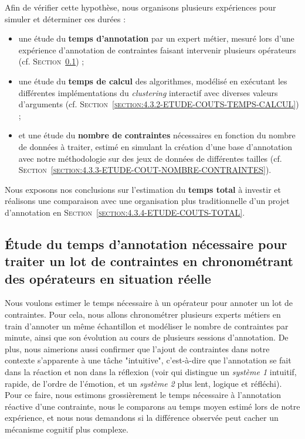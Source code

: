 	Afin de vérifier cette hypothèse, nous organisons plusieurs expériences pour simuler et déterminer ces durées :
	\begin{itemize}
		\item une étude du \textbf{temps d'annotation} par un expert métier, mesuré lors d'une expérience d'annotation de contraintes faisant intervenir plusieurs opérateurs (cf. \textsc{Section~\ref{section:4.3.1-ETUDE-COUTS-TEMPS-ANNOTATION}}) ;
		\item une étude du \textbf{temps de calcul} des algorithmes, modélisé en exécutant les différentes implémentations du \textit{clustering} interactif avec diverses valeurs d'arguments (cf. \textsc{Section~\ref{section:4.3.2-ETUDE-COUTS-TEMPS-CALCUL}}) ;
		\item et une étude du \textbf{nombre de contraintes} nécessaires en fonction du nombre de données à traiter, estimé en simulant la création d'une base d'annotation avec notre méthodologie sur des jeux de données de différentes tailles (cf. \textsc{Section~\ref{section:4.3.3-ETUDE-COUT-NOMBRE-CONTRAINTES}}).
	\end{itemize}
	Nous exposons nos conclusions sur l'estimation du \textbf{temps total} à investir et réalisons une comparaison avec une organisation plus traditionnelle d'un projet d'annotation en \textsc{Section~\ref{section:4.3.4-ETUDE-COUTS-TOTAL}}.
	
	
	\subsection{Étude du temps d'annotation nécessaire pour traiter un lot de contraintes en chronométrant des opérateurs en situation réelle}
	\label{section:4.3.1-ETUDE-COUTS-TEMPS-ANNOTATION}
		
		Nous voulons estimer le temps nécessaire à un opérateur pour annoter un lot de contraintes.
		Pour cela, nous allons chronométrer plusieurs experts métiers en train d'annoter un même échantillon et modéliser le nombre de contraintes par minute, ainsi que son évolution au cours de plusieurs sessions d'annotation.
		De plus, nous aimerions aussi confirmer que l'ajout de contraintes dans notre contexte s'apparente à une tâche "intuitive", c'est-à-dire que l'annotation se fait dans la réaction et non dans la réflexion (voir \cite{kahneman:2011:thinking-fast-slow} qui distingue un \textit{système 1} intuitif, rapide, de l'ordre de l'émotion, et un \textit{système 2} plus lent, logique et réfléchi).
		Pour ce faire, nous estimons grossièrement le temps nécessaire à l'annotation réactive d'une contrainte, nous le comparons au temps moyen estimé lors de notre expérience, et nous nous demandons si la différence observée peut cacher un mécanisme cognitif plus complexe.
	
